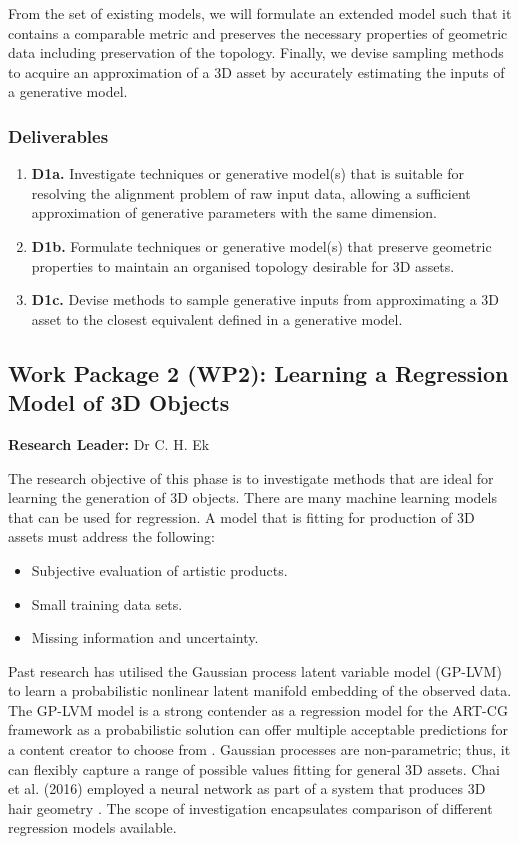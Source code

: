 \documentclass[a4paper, 11pt, onecolumn]{article} %
\numberwithin{equation}{section} %
\numberwithin{figure}{section} %
\numberwithin{table}{section} %
\begin{document}
From the set of existing models, we will formulate an extended model such that it contains a comparable metric and preserves the necessary properties of geometric data including preservation of the topology. Finally, we devise sampling methods to acquire an approximation of a 3D asset by accurately estimating the inputs of a generative model.

\subsubsection*{Deliverables} 
\begin{enumerate}
	\item \textbf{D1a.} Investigate techniques or generative model(s) that is suitable for resolving the alignment problem of raw input data, allowing a sufficient approximation of generative parameters with the same dimension.
	\item \textbf{D1b.} Formulate techniques or generative model(s) that preserve geometric properties to maintain an organised topology desirable for 3D assets.
	\item \textbf{D1c.} Devise methods to sample generative inputs from approximating a 3D asset to the closest equivalent defined in a generative model.
\end{enumerate}

\subsection*{Work Package 2 (WP2): Learning a Regression Model of 3D Objects}
\textbf{Research Leader:} Dr C. H. Ek\par

The research objective of this phase is to investigate methods that are ideal for learning the generation of 3D objects. There are many machine learning models that can be used for regression. A model that is fitting for production of 3D assets must address the following:
\begin{itemize}
	\item Subjective evaluation of artistic products.
	\item Small training data sets.
	\item Missing information and uncertainty.
\end{itemize}

Past research has utilised the Gaussian process latent variable model (GP-LVM) to learn a probabilistic nonlinear latent manifold embedding of the observed data. The GP-LVM model is a strong contender as a regression model for the ART-CG framework as a probabilistic solution can offer multiple acceptable predictions for a content creator to choose from \cite{gplvm}. Gaussian processes are non-parametric; thus, it can flexibly capture a range of possible values fitting for general 3D assets. Chai et al. (2016) employed a neural network as part of a system that produces 3D hair geometry \cite{autohair}. The scope of investigation encapsulates comparison of different regression models available.
\end{document}

